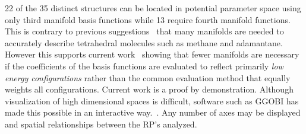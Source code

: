 \documentclass[preprint]{revtex4}
\newcommand{\mb}[1]{\ensuremath{\mbox{\boldmath $ #1 $}}}
\begin{document}
22 of the 35 distinct structures can be located in potential
parameter space using only third manifold basis functions while 13
require fourth manifold functions. This is contrary to previous
suggestions~\cite{Briels80} that many manifolds are needed to
accurately describe tetrahedral molecules such as methane and
adamantane. However this supports current work~\cite{Missaghi04}
showing that fewer manifolds are necessary if the coefficients of
the basis functions are evaluated to reflect primarily \emph{low
energy configurations} rather than the common evaluation method that
equally weights all configurations. Current work is a proof by
demonstration. Although visualization of high dimensional spaces is difficult,
software such as {G\footnotesize GOBI} has made this possible in an
interactive way.~\cite{ggobi03}.  Any number of axes may be displayed and
spatial relationships between the RP's analyzed.



\end{document}
